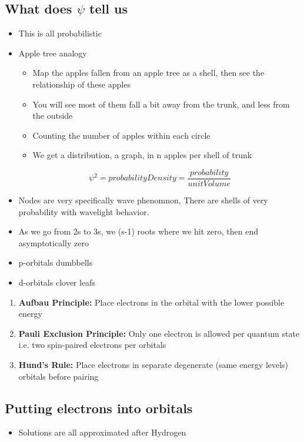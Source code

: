 \documentclass{article}
\begin{document}
\subsection{What does $\psi{}$ tell us}
\begin{itemize}
  \item This is all probabilistic
  \item Apple tree analogy
    \begin{itemize}
      \item Map the apples fallen from an apple tree as a shell, then see the relationship of these apples
      \item You will see most of them fall a bit away from the trunk, and less from the outside
      \item Counting the number of apples within each circle
      \item We get a distribution, a graph, in n apples per shell of trunk
    \end{itemize}
  $$\psi{}^2 = probability Density  = \frac{probability}{unit Volume} $$
\item Nodes are very specifically wave phenomnon,
  There are shells of very probability with wavelight behavior.
\item As we go from 2s to 3s, we (s-1) roots where we hit zero, then end asymptotically zero
\item p-orbitals \rightarrow{}  dumbbells
\item d-orbitals \rightarrow{} clover leafs
\end{itemize}

\begin{enumerate}
  \item \textbf{Aufbau Principle:} Place electrons in the orbital with the lower  possible energy
  \item \textbf{Pauli Exclusion Principle:} Only one electron is allowed per quantum state i.e. two spin-paired electrons per orbitals
  \item \textbf{Hund's Rule:} Place electrons in separate degenerate (same energy levels) orbitals before pairing
\end{enumerate}

\subsection{Putting electrons into orbitals}
\begin{itemize}
  \item Solutions are all approximated after Hydrogen
\end{itemize}
\end{document}
